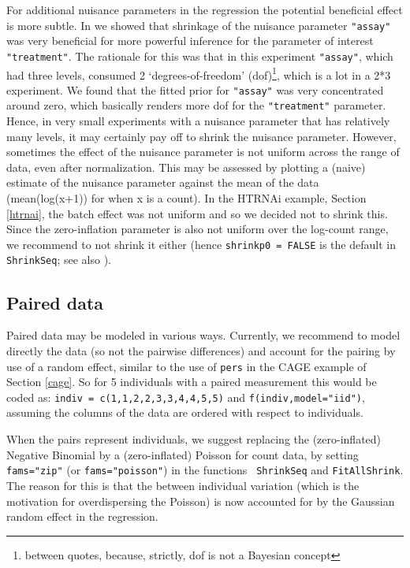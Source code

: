 \documentclass[11pt]{article}
\newcommand{\para}{\bigskip\noindent}
\begin{document}
\para
For additional nuisance parameters in the regression the potential beneficial effect is
more subtle. In \cite{WielHTRNAi} we showed that shrinkage of the nuisance parameter {\tt "assay"} was very beneficial for more powerful inference for the
parameter of interest {\tt "treatment"}. The rationale for this was that in this experiment {\tt "assay"}, which had three levels, consumed 2 `degrees-of-freedom' (dof)\footnote{between quotes,
because, strictly, dof is not a Bayesian concept}, which is a lot in a 2*3 experiment. We found that the fitted prior for {\tt "assay"} was
very concentrated around zero, which basically renders more dof for the {\tt "treatment"} parameter. Hence, in very small experiments with a nuisance parameter
that has relatively many levels, it may certainly pay off to shrink the nuisance parameter. However, sometimes
the effect of the nuisance parameter is not uniform across the range of data, even after normalization. This may be assessed by plotting a (naive) estimate of the nuisance parameter
against the mean of the data (mean(log(x+1)) for when x is a count). In the HTRNAi example, Section \ref{htrnai}, the batch effect was not uniform
and so we decided not to shrink this. Since the zero-inflation parameter is also not uniform over the log-count range, we recommend to not shrink it
either (hence {\tt shrinkp0 = FALSE} is the default in {\tt ShrinkSeq}; see also \cite{WielShrinkSeq}).


\subsection{Paired data}
Paired data may be modeled in various ways. Currently, we recommend to model directly the data (so not the pairwise differences) and
account for the pairing by use of a random effect, similar to the use of {\tt pers} in the CAGE example of Section \ref{cage}. So for
5 individuals with a paired measurement this would be coded as: {\tt indiv = c(1,1,2,2,3,3,4,4,5,5)} and {\tt f(indiv,model="iid")}, assuming the
columns of the data are ordered with respect to individuals.

\para When the pairs represent individuals, we suggest
replacing the (zero-inflated) Negative Binomial by a
(zero-inflated) Poisson for count data, by setting {\tt
fams="zip"} (or {\tt fams="poisson"}) in the functions {\tt
ShrinkSeq} and {\tt FitAllShrink}. The reason for this is that
the between individual variation (which is the motivation for
overdispersing the Poisson) is now accounted for by the
Gaussian random effect in the regression.
\end{document}
